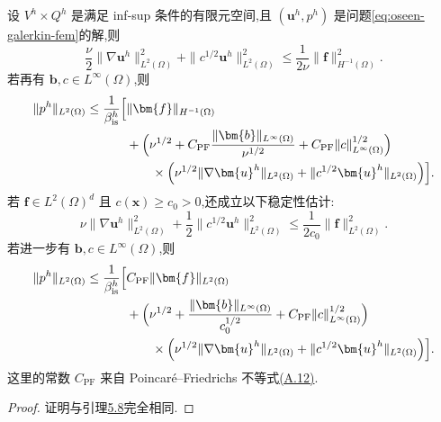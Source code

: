 \begin{lemma}[有限元解的稳定性]\label{lem:oseen-fem-stability}
设 $V^h\times Q^h$ 是满足 inf-sup 条件的有限元空间,且 $(\bm{u}^h,p^h)$ 是问题\cref{eq:oseen-galerkin-fem}的解,则
\begin{equation}\label{eq:oseen-fem-stability-velocity-hminus1}
  \frac{\nu}{2}\|\nabla\bm{u}^h\|_{L^2(\Omega)}^2
  +\|c^{1/2}\bm{u}^h\|_{L^2(\Omega)}^2
  \le\frac{1}{2\nu}\|\bm{f}\|_{H^{-1}(\Omega)}^2.
\end{equation}
若再有 $\bm{b},c\in L^\infty(\Omega)$,则
\[
\begin{aligned}
  \|p^h\|_{L^2(\Omega)}
  \le\frac{1}{\beta_{\mathrm{is}}^h}\Bigl[&
    \|\bm{f}\|_{H^{-1}(\Omega)}\\
    &+\Bigl(\nu^{1/2}
      +C_{\mathrm{PF}}\frac{\|\bm{b}\|_{L^\infty(\Omega)}}{\nu^{1/2}}
      +C_{\mathrm{PF}}\|c\|_{L^\infty(\Omega)}^{1/2}\Bigr)\\
    &\qquad\times\Bigl(
      \nu^{1/2}\|\nabla\bm{u}^h\|_{L^2(\Omega)}
      +\|c^{1/2}\bm{u}^h\|_{L^2(\Omega)}\Bigr)\Bigr].
\end{aligned}
\]
若 $\bm{f}\in L^2(\Omega)^d$ 且 $c(\bm{x})\ge c_0>0$,还成立以下稳定性估计:
\[
  \nu\|\nabla\bm{u}^h\|_{L^2(\Omega)}^2
  +\frac12\|c^{1/2}\bm{u}^h\|_{L^2(\Omega)}^2
  \le\frac{1}{2c_0}\|\bm{f}\|_{L^2(\Omega)}^2.
\]
若进一步有 $\bm{b},c\in L^\infty(\Omega)$,则
\[
\begin{aligned}
  \|p^h\|_{L^2(\Omega)}
  \le\frac{1}{\beta_{\mathrm{is}}^h}\Bigl[&
    C_{\mathrm{PF}}\|\bm{f}\|_{L^2(\Omega)}\\
    &+\Bigl(\nu^{1/2}
      +\frac{\|\bm{b}\|_{L^\infty(\Omega)}}{c_0^{1/2}}
      +C_{\mathrm{PF}}\|c\|_{L^\infty(\Omega)}^{1/2}\Bigr)\\
    &\qquad\times\Bigl(
      \nu^{1/2}\|\nabla\bm{u}^h\|_{L^2(\Omega)}
      +\|c^{1/2}\bm{u}^h\|_{L^2(\Omega)}\Bigr)\Bigr].
\end{aligned}
\]
这里的常数 $C_{\mathrm{PF}}$ 来自 Poincaré--Friedrichs 不等式\hyperref[eq:appendix-a-12]{(A.12)}.
\end{lemma}
\begin{proof}
证明与引理\hyperref[lem:oseen-solution-stability]{5.8}完全相同.
\end{proof}

